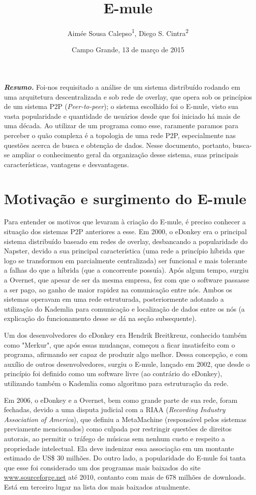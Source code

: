 \documentclass[a4paper]{article}
\title{E-mule}
\author{Aimée Sousa Calepso\textsuperscript{1}, Diego S. Cintra\textsuperscript{2}}
\affil{\textsuperscript{1}Faculdade de Computação – Universidade Federal de Mato Grosso do Sul (UFMS)\\
Caixa Postal 549 – 79.070-900 – Campo Grande – MS – Brasil\\
aimeesc@gmail.com, diego\_2337@hotmail.com}
\date{Campo Grande, 13 de março de 2015}
\begin{document}
\maketitle
\textbf{\textit{Resumo.}} Foi-nos requisitado a análise de um sistema distribuído rodando em uma arquitetura descentralizada e sob rede de 
overlay, que opera sob os princípios de um sistema P2P (\textit{Peer-to-peer}); o sistema escolhido foi o E-mule, visto sua vasta 
popularidade e quantidade de usuários desde que foi iniciado há mais de uma década. Ao utilizar de um programa como esse, raramente paramos 
para perceber o quão complexa é a topologia de uma rede P2P, especialmente nas questões acerca de busca e obtenção de dados. Nesse 
documento, portanto, busca-se ampliar o conhecimento geral da organização desse sistema, suas principais características, vantagens e 
desvantagens.

\section{Motivação e surgimento do E-mule}
	Para entender os motivos que levaram à criação do E-mule, é preciso conhecer a situação dos sistemas P2P anteriores a esse. Em 2000, 
o eDonkey era o principal sistema distribuído baseado em redes de overlay, desbancando a popularidade do Napster, devido a sua principal 
característica (uma rede a princípio híbrida que logo se transformou em parcialmente centralizada) ser funcional e mais tolerante a falhas 
do que a híbrida (que a concorrente possuía). Após algum tempo, surgiu a Overnet, que apesar de ser da mesma empresa, fez com que o software 
passasse a ser pago, ao ganho de maior rapidez na comunicação entre nós. Ambos os sistemas operavam em uma rede estruturada, posteriormente 
adotando a utilização do Kademlia para comunicação e localização de dados entre os nós (a explicação do funcionamento desse se dá na seção 
subsequente).

	Um dos desenvolvedores do eDonkey era Hendrik Breitkreuz, conhecido também como "Merkur", que após essas mudanças, começou a ficar 
insatisfeito com o programa, afirmando ser capaz de produzir algo melhor. Dessa concepção, e com auxílio de outros desenvolvedores, surgiu o 
E-mule, lançado em 2002, que desde o princípio foi definido como um software livre (ao contrário do eDonkey), utilizando também o Kademlia 
como algoritmo para estruturação da rede. 

	Em 2006, o eDonkey e a Overnet, bem como grande parte de sua rede, foram fechadas, devido a uma disputa judicial com a RIAA (\textit
{Recording Industry Association of America}), que definiu a MetaMachine (responsável pelos sistemas previamente mencionados) como culpada 
por restringir questões de direitos autorais, ao permitir o tráfego de músicas sem nenhum custo e respeito a propriedade intelectual. Ela 
deve indenizar essa associação em um montante estimado de US\$ 30 milhões. Do outro lado, a popularidade do E-mule foi tanta que esse foi 
considerado um dos programas mais baixados do site \url{www.sourceforge.net} até 2010, contanto com mais de 678 milhões de downloads. Está 
em terceiro lugar na lista dos mais baixados atualmente.
\end{document}
